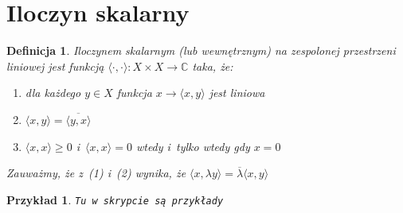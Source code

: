 \documentclass[11pt]{mwrep}
\renewcommand{\[}{\begin{equation}}
\renewcommand{\]}{\end{equation}}
\newcommand{\C}{{\ensuremath{\mathbb C}}}
\newtheorem{de}[subsection]{Definicja}
\newtheorem{ex}[subsection]{Przykład}
\newcounter{numer}
\begin{document}
\section{Iloczyn skalarny}
\begin{de}
	Iloczynem skalarnym (lub wewnętrznym)  na zespolonej przestrzeni liniowej jest funkcją $\langle \cdot, \cdot \rangle \colon X\times X \to\C$
	taka, że:
	\begin{enumerate}[(1)]
		\item dla każdego $y\in X$ funkcja $x \to \langle x,y \rangle$ jest liniowa
		\item $\langle x,y \rangle = \overline{\langle y,x \rangle}$
		\item $\langle x,x \rangle\ge 0$ i~$\langle x,x \rangle=0$ wtedy i~tylko wtedy gdy $x=0$ 
	\end{enumerate}
	Zauważmy, że z~(1) i~(2) wynika, że $\langle x,\lambda y \rangle = \overline{\lambda}\langle x,y \rangle$
\end{de}
\begin{ex}
	\texttt{Tu w~skrypcie są przykłady}
\end{ex}
\end{document}
